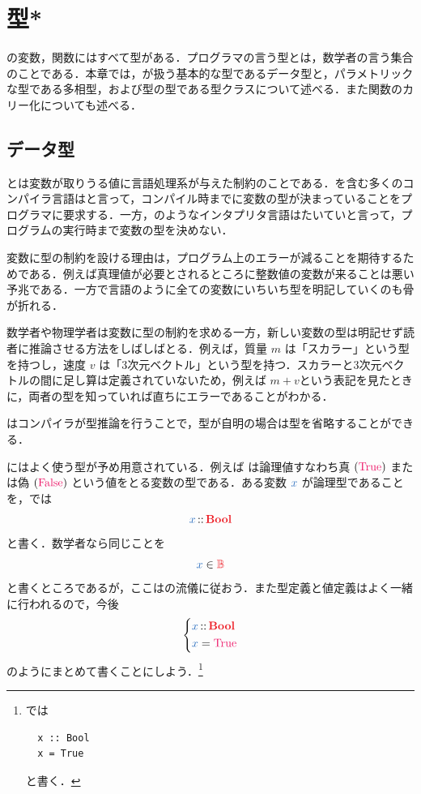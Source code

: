 \documentclass[a5paper,twoside,fleqn,draft]{jsbook}
\begin{document}
\chapter{型*}
\label{ch:type}

\begin{leader}
\haskell の変数，関数にはすべて型がある．プログラマの言う型とは，数学者の言う集合のことである．本章では，\haskell が扱う基本的な型であるデータ型と，パラメトリックな型である多相型，および型の型である型クラスについて述べる．また関数のカリー化についても述べる．
\end{leader}

\section{データ型}

とは変数が取りうる値に言語処理系が与えた制約のことである．\haskell を含む多くのコンパイラ言語はと言って，コンパイル時までに変数の型が決まっていることをプログラマに要求する．一方，\python のようなインタプリタ言語はたいていと言って，プログラムの実行時まで変数の型を決めない．

変数に型の制約を設ける理由は，プログラム上のエラーが減ることを期待するためである．例えば真理値が必要とされるところに整数値の変数が来ることは悪い予兆である．一方で\clang 言語のように全ての変数にいちいち型を明記していくのも骨が折れる．

数学者や物理学者は変数に型の制約を求める一方，新しい変数の型は明記せず読者に推論させる方法をしばしばとる．例えば，質量 $m$ は「スカラー」という型を持つし，速度 $v$ は「3次元ベクトル」という型を持つ．スカラーと3次元ベクトルの間に足し算は定義されていないため，例えば $m+v$という表記を見たときに，両者の型を知っていれば直ちにエラーであることがわかる．

\haskell はコンパイラが型推論を行うことで，型が自明の場合は型を省略することができる．

\separator

\haskell にはよく使う型が予め用意されている．例えば は論理値すなわち真 $(\hTrue)$ または偽 $(\hFalse)$ という値をとる変数の型である．ある変数 $\hVar{x}$ が論理型であることを，\haskell では
\begin{equation}
  \hVar{x}
  \hIsTypeOf\hBool
\end{equation}
と書く．数学者なら同じことを
\begin{equation}
  \hVar{x}
  \in\hSet{B}
\end{equation}
と書くところであるが，ここは\haskell の流儀に従おう．また型定義と値定義はよく一緒に行われるので，今後
\begin{equation}
  \left\{
  \begin{aligned}
    \hVar{x}
    &\hIsTypeOf\hBool\\
    \hVar{x}
    &=\hTrue
  \end{aligned}
  \right.
\end{equation}
のようにまとめて書くことにしよう．\footnote{\haskell では
\begin{verbatim}
  x :: Bool
  x = True
\end{verbatim}
と書く．}
\end{document}
